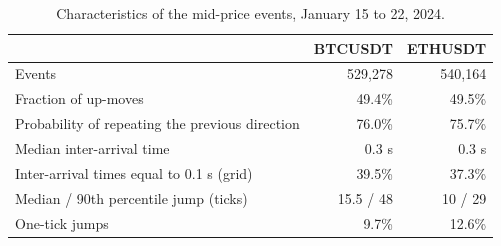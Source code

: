 \begin{table}[htbp]
\centering
\caption{Characteristics of the mid-price events, January 15 to 22, 2024.}
\label{tab:caracteristicas}
\small
\begin{tabular}{lrr}
\toprule
 & BTCUSDT & ETHUSDT\\
\midrule
Events & 529,278 & 540,164\\
Fraction of up-moves & 49.4\% & 49.5\%\\
Probability of repeating the previous direction & 76.0\% & 75.7\%\\
Median inter-arrival time & 0.3 s & 0.3 s\\
Inter-arrival times equal to 0.1 s (grid) & 39.5\% & 37.3\%\\
Median / 90th percentile jump (ticks) & 15.5 / 48 & 10 / 29\\
One-tick jumps & 9.7\% & 12.6\%\\
\bottomrule
\end{tabular}
\end{table}
